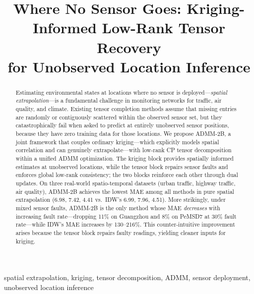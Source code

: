 \documentclass[journal]{IEEEtran}
\begin{document}
\title{Where No Sensor Goes: Kriging-Informed Low-Rank Tensor Recovery\\for Unobserved Location Inference}

\author{
}

\maketitle

\begin{abstract}
Estimating environmental states at locations where no sensor is deployed---\emph{spatial extrapolation}---is a fundamental challenge in monitoring networks for traffic, air quality, and climate. Existing tensor completion methods assume that missing entries are randomly or contiguously scattered within the observed sensor set, but they catastrophically fail when asked to predict at entirely unobserved sensor positions, because they have zero training data for those locations. We propose ADMM-2B, a joint framework that couples ordinary kriging---which explicitly models spatial correlation and can genuinely extrapolate---with low-rank CP tensor decomposition within a unified ADMM optimization. The kriging block provides spatially informed estimates at unobserved locations, while the tensor block repairs sensor faults and enforces global low-rank consistency; the two blocks reinforce each other through dual updates. On three real-world spatio-temporal datasets (urban traffic, highway traffic, air quality), ADMM-2B achieves the lowest MAE among all methods in pure spatial extrapolation (6.98, 7.42, 4.41 vs.\ IDW's 6.99, 7.96, 4.51). More strikingly, under mixed sensor faults, ADMM-2B is the only method whose MAE \emph{decreases} with increasing fault rate---dropping 11\% on Guangzhou and 8\% on PeMSD7 at 30\% fault rate---while IDW's MAE increases by 130--216\%. This counter-intuitive improvement arises because the tensor block repairs faulty readings, yielding cleaner inputs for kriging.
\end{abstract}

\begin{IEEEkeywords}
spatial extrapolation, kriging, tensor decomposition, ADMM, sensor deployment, unobserved location inference
\end{IEEEkeywords}
\end{document}
